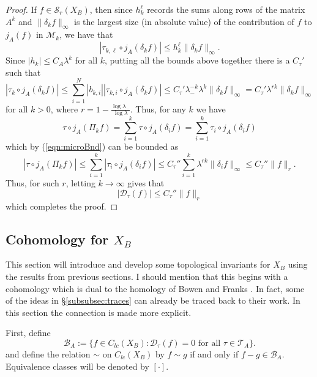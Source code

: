 \documentclass[12pt]{amsart}
\theoremstyle{plain}
\theoremstyle{definition}
\begin{document}
\begin{proof}
    If $f\in\mathcal{S} _r(X_B)$, then since $h_{k}^\ell$ records the sums along rows of the matrix $A^k$ and $\|\delta_k  f\|_\infty$ is the largest size (in absolute value) of the contribution of $f$ to $j_A(f)$ in $\mathcal{M}_k$, we have that
    \begin{equation*}
        |\tau_{k,\ell}\circ j_A(\delta_k f)| \leq h_{k}^{\ell} \|\delta_k  f\|_\infty.
    \end{equation*}
    Since $|h_k|\leq C_A \lambda^k$ for all $k$, putting all the bounds above together there is a $C_\tau '$ such that
    \begin{equation}
        \label{eqn:microBnd}
        |\tau_k\circ j_A(\delta _k f)| \leq \sum_{i=1}^N |b_{k,i}| | \tau_{k,i}\circ j_A(\delta_k  f)|\leq C_{\tau}' \lambda_-^{-k}\lambda^k \|\delta_k  f\|_{\infty} = C_{\tau}' \lambda^{rk} \|\delta_k  f\|_{\infty}
    \end{equation}
    for all $k>0$, where $r = 1-\frac{\log \lambda_-}{\log \lambda}$. Thus, for any $k$ we have
    $$\tau\circ j_A(\Pi _k f) = \sum_{i=1}^k \tau\circ j_A(\delta _i f) = \sum_{i=1}^k \tau_i\circ j_A(\delta _i f)$$
    which by (\ref{eqn:microBnd}) can be bounded as
    $$|\tau\circ j_A(\Pi _k f)| \leq  \sum_{i=1}^k |\tau_i\circ j_A(\delta _i f)|  \leq C_{\tau}''\sum_{i=1}^k \lambda^{rk} \|\delta_i  f\|_{\infty}  \leq C_{\tau}'' \|f\|_r.$$
    Thus, for such $r$, letting $k\rightarrow \infty$ gives that
    $$|\mathcal{D}_\tau(f)|\leq  C_{\tau}'' \|f\|_r $$
    which completes the proof.
\end{proof}
\subsection{Cohomology for $X_B$}
This section will introduce and develop some topological invariants for $X_B$ using the results from previous sections.  I should mention that this begins with a cohomology which is dual to the homology of Bowen and Franks \cite[\S 2]{BowenFranks:homology}. In fact, some of the ideas in \S \ref{subsubsec:traces} can already be traced back to their work. In this section the connection is made more explicit.

First, define
$$\mathcal{B}_A := \{f\in C_{lc}(X_B): \mathcal{D}_\tau(f) = 0 \mbox{ for all }\tau\in\mathcal{ T}_A\}.$$
and define the relation $\sim$ on $C_{lc}(X_B)$ by $f\sim g$ if and only if $f-g\in\mathcal{B}_A$. Equivalence classes will be denoted by $[\cdot]$.
\end{document}
